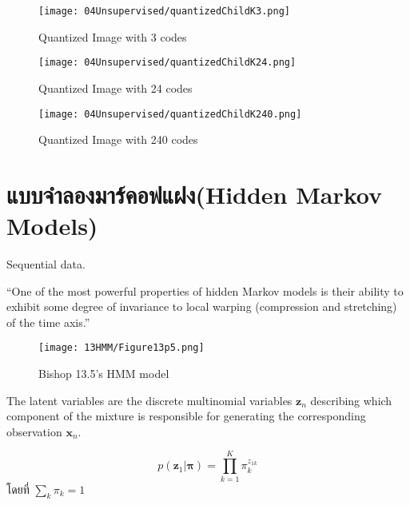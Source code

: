 %
\begin{figure}
\begin{center}
\texttt{[image: 04Unsupervised/quantizedChildK3.png]}
\end{center}
\caption{Quantized Image with 3 codes}
\label{fig: child sheep 3 codes}
\end{figure}
%

%
\begin{figure}
\begin{center}
\texttt{[image: 04Unsupervised/quantizedChildK24.png]}
\end{center}
\caption{Quantized Image with 24 codes}
\label{fig: child sheep 24 codes}
\end{figure}
%

%
\begin{figure}
\begin{center}
\texttt{[image: 04Unsupervised/quantizedChildK240.png]}
\end{center}
\caption{Quantized Image with 240 codes}
\label{fig: child sheep 240 codes}
\end{figure}
%

\section{แบบจำลองมาร์คอฟแฝง(Hidden Markov Models)}

Sequential data.

``One of the most powerful properties of hidden Markov models is their ability to exhibit some degree of invariance to local warping (compression and stretching) of the time axis.''


%
\begin{figure}
\begin{center}
\texttt{[image: 13HMM/Figure13p5.png]}
\end{center}
\caption{Bishop 13.5's HMM model}
\label{fig: Bishop 13.5}
\end{figure}

The latent variables are the discrete multinomial variables $\textbf{z}_n$ describing which component of the mixture is responsible for generating the corresponding observation $\textbf{x}_n$.

\begin{equation}
p(\textbf{z}_1 | \bm{\pi}) = \prod_{k=1}^{K} \pi_k^{z_{1k}}
\label{eq: Bishop 13.8}
\end{equation}
โดยที่ $\sum_k \pi_k = 1$

